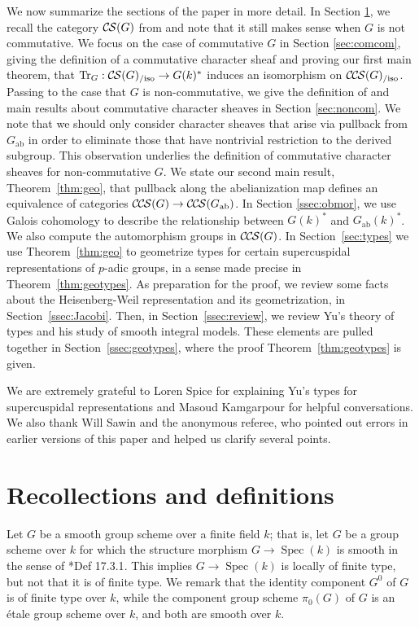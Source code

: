 \documentclass[10pt]{amsart}
\theoremstyle{plain}
\theoremstyle{definition}
\newcommand{\Fq}{k}
\newcommand{\Spec}[1]{{\operatorname{Spec}(#1)}}
\newcommand{\ab}{_{\operatorname{ab}}}
\DeclareMathOperator{\Tr}{Tr}
\newcommand{\TrFrob}[1]{\Tr_{#1}}
\newcommand{\CS}{{\mathcal{C\hskip-0.8pt S}}}
\newcommand{\CCS}{{\mathcal{C\hskip-.8pt C\hskip-0.8pt S}}}
\newcommand{\CSiso}[1]{\CS(#1)_{/\text{iso}}}
\newcommand{\CCSiso}[1]{\CCS(#1)_{/\text{iso}}}
\begin{document}
\bigskip

We now summarize the sections of the paper in more detail.
In Section \ref{sec:defs}, we recall the category $\CS(G)$ from \cite{cunningham-roe:13a} and note that it still makes sense when $G$ is not commutative.  
We focus on the case of commutative $G$ in Section \ref{sec:comcom},
giving the definition of a commutative character sheaf and proving our first main theorem, that
$\TrFrob{G} : \CSiso{G} \to G(k)^*$ induces an isomorphism on $\CCSiso{G}$.
Passing to the case that $G$ is non-commutative, we give the definition of and main results about commutative character sheaves in Section \ref{sec:noncom}.  
We note that we should only consider character sheaves that arise via pullback from $G\ab$ in order to eliminate those that have nontrivial restriction to the derived subgroup.  
This observation underlies the definition of commutative character sheaves for non-commutative $G$.  
We state our second main result, Theorem~\ref{thm:geo}, that pullback along the abelianization map defines an equivalence of categories $\CCS(G) \to \CCS(G\ab)$.
In Section \ref{ssec:obmor}, we use Galois cohomology to describe the relationship between $G(k)^*$ and $G\ab(k)^*$.  
We also compute the automorphism groups in $\CCS(G)$.
In Section~\ref{sec:types} we use Theorem~\ref{thm:geo} to geometrize types for certain supercuspidal representations of $p$-adic groups, in a sense made precise in Theorem~\ref{thm:geotypes}.
As preparation for the proof, we review some facts about the Heisenberg-Weil representation and its geometrization, in Section~\ref{ssec:Jacobi}.
Then, in Section~\ref{ssec:review}, we review Yu's theory of types and his study of smooth integral models.  
These elements are pulled together in Section~\ref{ssec:geotypes}, where the proof Theorem~\ref{thm:geotypes} is given.



\bigskip

We are extremely grateful to Loren Spice for explaining Yu's types for supercuspidal representations and Masoud Kamgarpour for helpful conversations.
We also thank Will Sawin and the anonymous referee, who pointed out errors in earlier versions of this paper and helped us clarify several points.

\section{Recollections and definitions} \label{sec:defs}

Let $G$ be a smooth group scheme over a finite field $\Fq$; that is, let $G$ be a group scheme over $\Fq$
for which the structure morphism $G \to \Spec{\Fq}$ is smooth in the sense of \cite{EGAIV4}*{Def 17.3.1}.
This implies $G \to \Spec{\Fq}$ is locally of finite type, but not that it is of finite type.
We remark that the identity component $G^0$ of $G$ is of finite type over $\Fq$, while the component group scheme
$\pi_0(G)$ of $G$ is an \'etale group scheme over $\Fq$, and both are smooth over $\Fq$.
\end{document}
